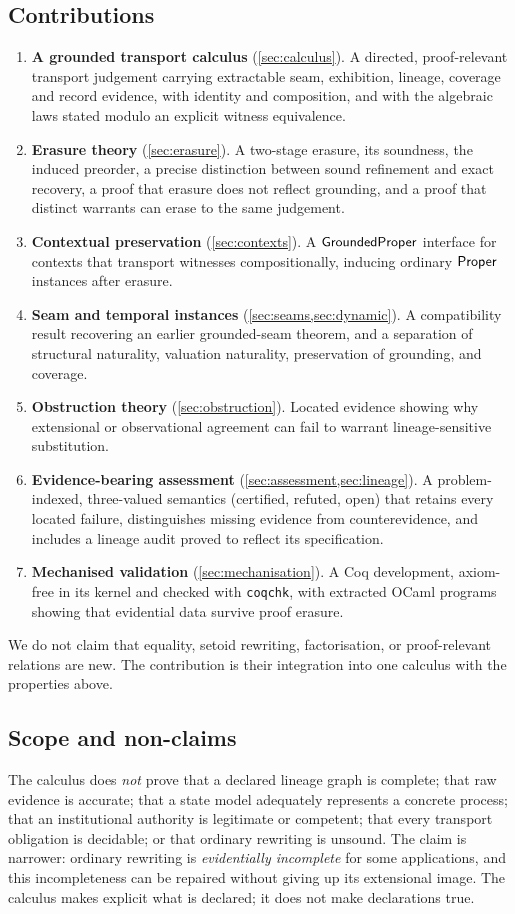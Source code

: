 \subsection{Contributions}
\begin{enumerate}
\item \textbf{A grounded transport calculus} (\cref{sec:calculus}). A directed, proof-relevant transport judgement carrying extractable seam, exhibition, lineage, coverage and record evidence, with identity and composition, and with the algebraic laws stated modulo an explicit witness equivalence.
\item \textbf{Erasure theory} (\cref{sec:erasure}). A two-stage erasure, its soundness, the induced preorder, a precise distinction between sound refinement and exact recovery, a proof that erasure does not reflect grounding, and a proof that distinct warrants can erase to the same judgement.
\item \textbf{Contextual preservation} (\cref{sec:contexts}). A $\mathsf{GroundedProper}$ interface for contexts that transport witnesses compositionally, inducing ordinary $\mathsf{Proper}$ instances after erasure.
\item \textbf{Seam and temporal instances} (\cref{sec:seams,sec:dynamic}). A compatibility result recovering an earlier grounded-seam theorem, and a separation of structural naturality, valuation naturality, preservation of grounding, and coverage.
\item \textbf{Obstruction theory} (\cref{sec:obstruction}). Located evidence showing why extensional or observational agreement can fail to warrant lineage-sensitive substitution.
\item \textbf{Evidence-bearing assessment} (\cref{sec:assessment,sec:lineage}). A problem-indexed, three-valued semantics (certified, refuted, open) that retains every located failure, distinguishes missing evidence from counterevidence, and includes a lineage audit proved to reflect its specification.
\item \textbf{Mechanised validation} (\cref{sec:mechanisation}). A Coq development, axiom-free in its kernel and checked with \texttt{coqchk}, with extracted OCaml programs showing that evidential data survive proof erasure.
\end{enumerate}
We do not claim that equality, setoid rewriting, factorisation, or proof-relevant relations are new. The contribution is their integration into one calculus with the properties above.

\subsection{Scope and non-claims}
The calculus does \emph{not} prove that a declared lineage graph is complete; that raw evidence is accurate; that a state model adequately represents a concrete process; that an institutional authority is legitimate or competent; that every transport obligation is decidable; or that ordinary rewriting is unsound. The claim is narrower: ordinary rewriting is \emph{evidentially incomplete} for some applications, and this incompleteness can be repaired without giving up its extensional image. The calculus makes explicit what is declared; it does not make declarations true.
